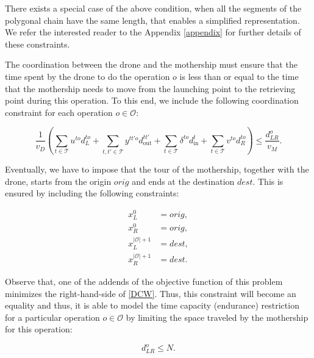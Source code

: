 There exists a special case of the above condition, when all the segments of the polygonal chain have the same length, that enables a simplified representation. We refer the interested reader to the Appendix \ref{appendix} for further details of these constraints.


The coordination between the drone and the mothership must ensure that the time spent by the drone to do the operation $o$ is less than or equal to the time that the mothership needs to move from the launching point to the retrieving point during this operation. To this end, we include the following coordination constraint for each operation $o\in \mathcal O$:

\begin{equation}\tag{DCW}\label{DCW}
\frac{1}{v_D}\left(\sum_{t\in \mathcal T} u^{to}d_L^{to} + \sum_{t, t'\in \mathcal T}y^{tt'o}d_{\text{out}}^{tt'} + \sum_{t\in\mathcal T} \delta^{to}d_{\text{in}}^{t} + \sum_{t\in \mathcal T} v^{to}d_R^{to}\right) \leq \frac{d_{LR}^o}{v_M}.
\end{equation}

\noindent
Eventually, we have to impose that the tour of the mothership, together with the drone, starts from the origin $orig$ and ends at the destination $dest$. This is ensured by including the following constraints:

\begin{align*}
x_L^0 & =  orig,  \tag{ORIG$_1$} \label{eq:O1} \\
x_R^0 & =  orig,  \tag{ORIG$_2$} \label{eq:O2} \\
x_L^{|\mathcal{O}|+1} & =  dest,  \tag{DEST$_1$} \label{eq:D1} \\
x_R^{|\mathcal{O}|+1} & =  dest.  \tag{DEST$_2$} \label{eq:D2} 
\end{align*}

Observe that, one of the addends of the objective function of this problem minimizes the right-hand-side of \eqref{DCW}. Thus, this constraint will become an equality and thus, it is able to model the time capacity (endurance) restriction for a particular operation $o\in \mathcal O$ by limiting the space traveled by the mothership for this operation:

\begin{equation}\tag{Capacity}\label{CAP}
    d_{LR}^o \leq N.
\end{equation}





